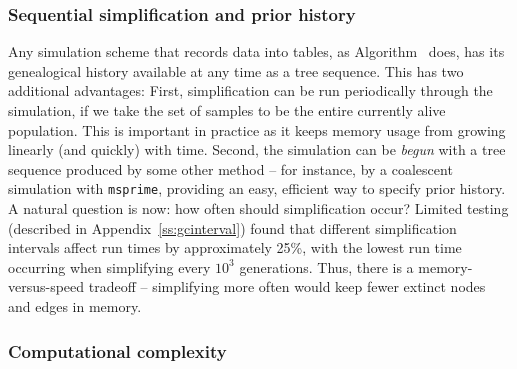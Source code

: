 \documentclass{article}
\newcommand{\msprime}{\texttt{msprime}}
\newcommand{\krt}[1]{{\em \color{green} #1}}
\begin{document}
\subsubsection*{Sequential simplification and prior history}
\label{ss:seq_simp}

Any simulation scheme that records data into tables,
as Algorithm~ does,
has its genealogical history available at any time as a tree sequence.
This has two additional advantages:
First, simplification can be run periodically through the simulation,
if we take the set of samples to be the entire currently alive population.
This is important in practice as it keeps memory usage from growing linearly (and quickly) with time.
Second, the simulation can
be \emph{begun} with a tree sequence produced by some other method -- for
instance, by a coalescent simulation with \msprime,
providing an easy, efficient way to specify prior history.
A natural question is now: how often should simplification occur?
Limited testing (described in Appendix~\ref{ss:gcinterval})
found that different simplification intervals affect run times by approximately
25\%, with the lowest run time occurring when simplifying every $10^3$ generations.
Thus, there is a memory-versus-speed tradeoff
-- simplifying more often would keep fewer extinct nodes and edges in memory.

%



\subsubsection*{Computational complexity}
\end{document}
